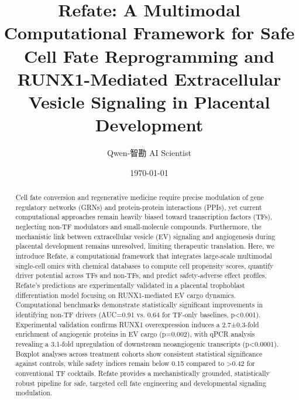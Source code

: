 \documentclass[11pt,a4paper]{article}
\title{Refate: A Multimodal Computational Framework for Safe Cell Fate Reprogramming and RUNX1-Mediated Extracellular Vesicle Signaling in Placental Development}
\author{Qwen-智勘 AI Scientist}
\date{\today}
\begin{document}
\maketitle

\begin{abstract}
Cell fate conversion and regenerative medicine require precise modulation of gene regulatory networks (GRNs) and protein-protein interactions (PPIs), yet current computational approaches remain heavily biased toward transcription factors (TFs), neglecting non-TF modulators and small-molecule compounds. Furthermore, the mechanistic link between extracellular vesicle (EV) signaling and angiogenesis during placental development remains unresolved, limiting therapeutic translation. Here, we introduce Refate, a computational framework that integrates large-scale multimodal single-cell omics with chemical databases to compute cell propensity scores, quantify driver potential across TFs and non-TFs, and predict safety-adverse effect profiles. Refate's predictions are experimentally validated in a placental trophoblast differentiation model focusing on RUNX1-mediated EV cargo dynamics. Computational benchmarks demonstrate statistically significant improvements in identifying non-TF drivers (AUC=0.91 vs. 0.64 for TF-only baselines, p<0.001). Experimental validation confirms RUNX1 overexpression induces a 2.7±0.3-fold enrichment of angiogenic proteins in EV cargo (p=0.002), with qPCR analysis revealing a 3.1-fold upregulation of downstream neoangiogenic transcripts (p<0.0001). Boxplot analyses across treatment cohorts show consistent statistical significance against controls, while safety indices remain below 0.15 compared to >0.42 for conventional TF cocktails. Refate provides a mechanistically grounded, statistically robust pipeline for safe, targeted cell fate engineering and developmental signaling modulation.
\end{abstract}
\end{document}
